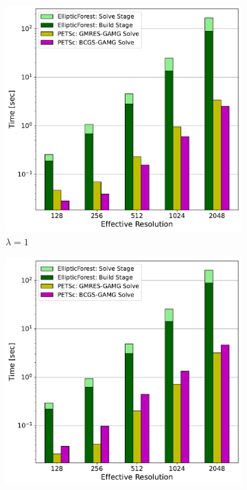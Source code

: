 \begin{figure}
    \centering
    \begin{subfigure}[t]{0.48\textwidth}
        \includegraphics[width=1\textwidth, clip=true, trim={15 25 50 60}]{figures/case03-l1-stacked-bar-plot-comparisons-no-title.pdf}
        \caption{$\lambda = 1$}
    \end{subfigure}
    \begin{subfigure}[t]{0.48\textwidth}
        \includegraphics[width=1\textwidth, clip=true, trim={15 25 50 60}]{figures/case03-l10-stacked-bar-plot-comparisons-no-title.pdf}

\end{subfigure}
\end{figure}
